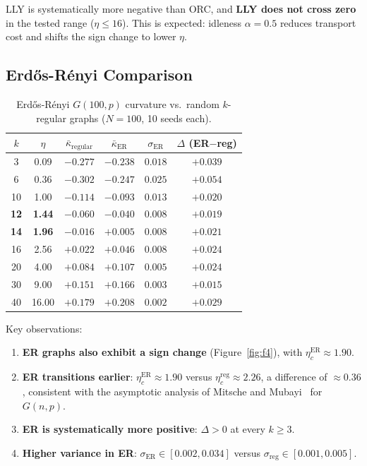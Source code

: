 \documentclass[12pt]{article}
\newcommand{\kbar}{\bar{\kappa}}
\newcommand{\etac}{\eta_c}
\begin{document}
LLY is systematically more negative than ORC, and \textbf{LLY does not cross zero} in the
tested range ($\eta \leq 16$). This is expected: idleness $\alpha = 0.5$ reduces transport
cost and shifts the sign change to lower $\eta$.

\subsection{Erd\H{o}s-R\'{e}nyi Comparison}

\begin{table}[ht]
\centering
\caption{Erd\H{o}s-R\'{e}nyi $G(100, p)$ curvature vs.\ random $k$-regular graphs
($N = 100$, 10 seeds each).}
\label{tab:er}
\begin{tabular}{cc ccc c}
\toprule
$k$ & $\eta$ & $\kbar_{\mathrm{regular}}$ & $\kbar_{\mathrm{ER}}$ & $\sigma_{\mathrm{ER}}$ & $\Delta$ (ER$-$reg) \\
\midrule
3  & 0.09 & $-0.277$ & $-0.238$ & $0.018$ & $+0.039$ \\
6  & 0.36 & $-0.302$ & $-0.247$ & $0.025$ & $+0.054$ \\
10 & 1.00 & $-0.114$ & $-0.093$ & $0.013$ & $+0.020$ \\
\textbf{12} & \textbf{1.44} & $\bm{-0.060}$ & $\bm{-0.040}$ & $0.008$ & $+0.019$ \\
\textbf{14} & \textbf{1.96} & $\bm{-0.016}$ & $\bm{+0.005}$ & $0.008$ & $+0.021$ \\
16 & 2.56 & $+0.022$ & $+0.046$ & $0.008$ & $+0.024$ \\
20 & 4.00 & $+0.084$ & $+0.107$ & $0.005$ & $+0.024$ \\
30 & 9.00 & $+0.151$ & $+0.166$ & $0.003$ & $+0.015$ \\
40 & 16.00& $+0.179$ & $+0.208$ & $0.002$ & $+0.029$ \\
\bottomrule
\end{tabular}
\end{table}

Key observations:
\begin{enumerate}
  \item \textbf{ER graphs also exhibit a sign change} (Figure~\ref{fig:f4}), with
  $\etac^{\mathrm{ER}} \approx 1.90$.

  \item \textbf{ER transitions earlier}: $\etac^{\mathrm{ER}} \approx 1.90$ versus
  $\etac^{\mathrm{reg}} \approx 2.26$, a difference of $\approx 0.36$, consistent with the
  asymptotic analysis of Mitsche and Mubayi~\cite{Mitsche2015} for $G(n,p)$.

  \item \textbf{ER is systematically more positive}: $\Delta > 0$ at every $k \geq 3$.

  \item \textbf{Higher variance in ER}: $\sigma_{\mathrm{ER}} \in [0.002, 0.034]$
  versus $\sigma_{\mathrm{reg}} \in [0.001, 0.005]$.
\end{enumerate}
\end{document}
